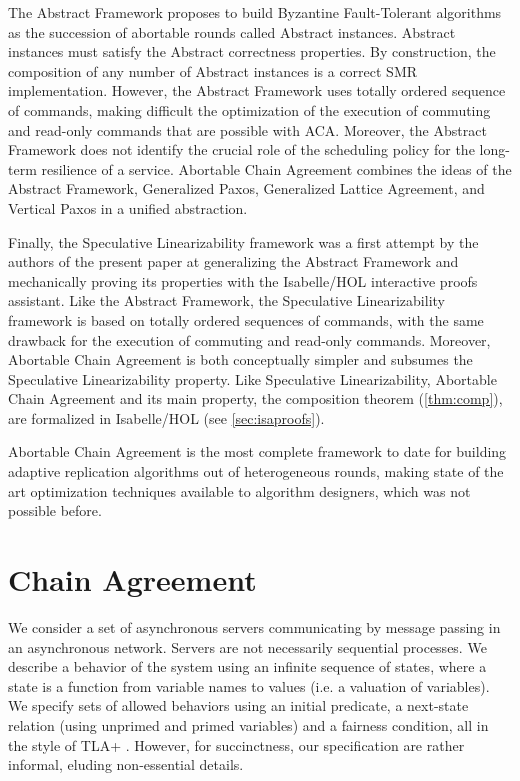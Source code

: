 The Abstract Framework \cite{GuerraouiETAL10Next700BftProtocols} proposes to
build Byzantine Fault-Tolerant algorithms as the succession of abortable rounds
called Abstract instances. Abstract instances must satisfy the Abstract
correctness properties. By construction, the composition of any number of
Abstract instances is a correct SMR implementation. However, the Abstract
Framework uses totally ordered sequence of commands, making difficult the
optimization of the execution of commuting and read-only commands that are
possible with ACA.  Moreover, the Abstract Framework does not identify the
crucial role of the scheduling policy for the long-term resilience of a service.
Abortable Chain Agreement combines the ideas of the Abstract Framework,
Generalized Paxos, Generalized Lattice Agreement, and Vertical Paxos in a
unified abstraction. 

Finally, the Speculative Linearizability framework
\cite{GuerraouiKuncakLosa12SpeculativeLinearizability} was a first
attempt by the authors of the present paper at generalizing the
Abstract Framework and mechanically proving its properties with the
Isabelle/HOL interactive
proofs assistant.  Like the Abstract Framework, the
Speculative Linearizability framework is based on totally ordered
sequences of commands, with the same drawback for the execution of
commuting and read-only commands. Moreover, Abortable Chain Agreement is both
conceptually simpler and subsumes the Speculative Linearizability
property.  Like Speculative Linearizability, Abortable Chain Agreement
and its main property, the composition theorem (\cref{thm:comp}), are
formalized in Isabelle/HOL (see \cref{sec:isaproofs}).

Abortable Chain Agreement is the most complete framework to date for building
adaptive replication algorithms out of heterogeneous rounds, making state of the
art optimization techniques available to algorithm designers, which was not
possible before.

\section{Chain Agreement}
\label{sec:ca}

We consider a set of asynchronous servers communicating by message passing in an
asynchronous network. Servers are not necessarily sequential processes. We
describe a behavior of the system using an infinite sequence of states, where a
state is a function from variable names to values (i.e. a valuation
of variables).  We specify sets of allowed behaviors using an initial predicate,
a next-state relation (using unprimed and primed variables) and a fairness
condition, all in the style of TLA+ \cite{Lamport02SpecifyingSystems}. However,
for succinctness, our specification are rather informal, eluding non-essential
details.

